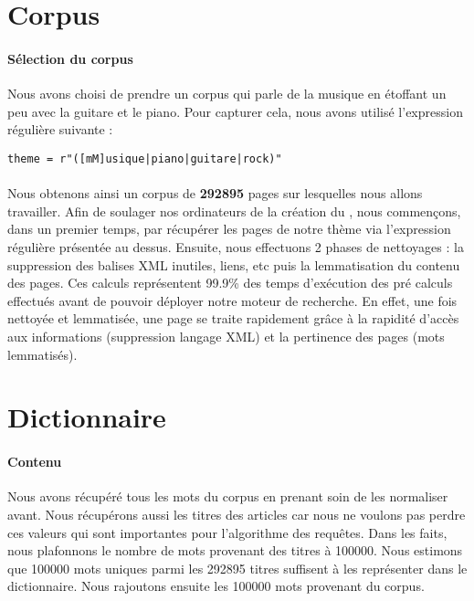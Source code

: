 \documentclass[10pt,a4paper]{article}
\begin{document}

\section{Corpus}
\paragraph{Sélection du corpus} Nous avons choisi de prendre un corpus qui parle de la musique en étoffant un peu avec la guitare et le piano. Pour capturer cela, nous avons utilisé l'expression régulière suivante :
\begin{verbatim} 
theme = r"([mM]usique|piano|guitare|rock)"
\end{verbatim}
\paragraph{}Nous obtenons ainsi un corpus de \textbf{292895} pages sur lesquelles nous allons travailler. Afin de soulager nos ordinateurs de la création du , nous commençons, dans un premier temps, par récupérer les pages de notre thème via l'expression régulière présentée au dessus. Ensuite, nous effectuons 2 phases de nettoyages : la suppression des balises XML inutiles, liens, etc puis la lemmatisation du contenu des pages. Ces calculs représentent 99.9\% des temps d'exécution des pré calculs effectués avant de pouvoir déployer notre moteur de recherche. En effet, une fois nettoyée et lemmatisée, une page se traite rapidement grâce à la rapidité d'accès aux informations (suppression langage XML) et la pertinence des pages (mots lemmatisés).


\section{Dictionnaire}
\paragraph{Contenu} Nous avons récupéré tous les mots du corpus en prenant soin de les normaliser avant. Nous récupérons aussi les titres des articles car nous ne voulons pas perdre ces valeurs qui sont importantes pour l'algorithme des requêtes. Dans les faits, nous plafonnons le nombre de mots provenant des titres à 100000. Nous estimons que 100000 mots uniques parmi les 292895 titres suffisent à les représenter dans le dictionnaire. Nous rajoutons ensuite les 100000 mots provenant du corpus.
\end{document}
